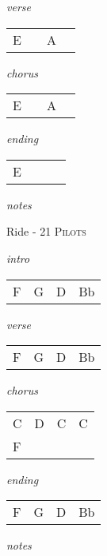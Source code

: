 \documentclass[12pt]{article}
\begin{document}
\textit{verse}

\begin{tabular}{|P{1.25in}|P{1.25in}|P{1.25in}|P{1.25in}|}
  E &   & A  &   \\
\end{tabular}

\textit{chorus}

\begin{tabular}{|P{1.25in}|P{1.25in}|P{1.25in}|P{1.25in}|}
  E &   & A  &   \\
\end{tabular}

\textit{ending}

\begin{tabular}{|P{1.25in}|P{1.25in}|P{1.25in}|P{1.25in}|}
  E &   &   &   \\
\end{tabular}

\textit{notes}

\newpage

{\Huge Ride} {\huge - \textsc{21 Pilots}}

\huge
\textit{intro}

\begin{tabular}{|P{1.25in}|P{1.25in}|P{1.25in}|P{1.25in}|}
  F & G  &  D &  Bb \\
\end{tabular}

\textit{verse}

\begin{tabular}{|P{1.25in}|P{1.25in}|P{1.25in}|P{1.25in}|}
  F & G  &  D &  Bb \\
\end{tabular}

\textit{chorus}

\begin{tabular}{|P{1.25in}|P{1.25in}|P{1.25in}|P{1.25in}|}
  C &  D &   C &  C  \\
  F &    &     &     \\
  
\end{tabular}

\textit{ending}

\begin{tabular}{|P{1.25in}|P{1.25in}|P{1.25in}|P{1.25in}|}
  F &  G & D  &  Bb \\
\end{tabular}

\textit{notes}

\newpage
\end{document}
